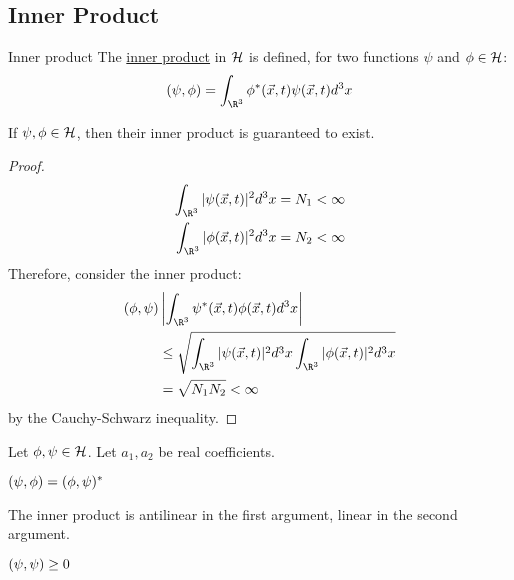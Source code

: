 \documentclass[../Main.tex]{subfiles}
\begin{document}
\subsection{Inner Product}
\begin{definition}{Inner product}
    The \underline{inner product} in $\mathcal{H}$ is defined, for two functions $\psi$ and $\phi \in \mathcal{H}$:
    \begin{equation}
        \inn{\psi}{\phi} = \int_{\R^3} \phi^*(\vec{x}, t) \psi(\vec{x}, t) d^3x
        \label{eqnHilbInnProd}
    \end{equation}
\end{definition}
\begin{theorem}
    If $\psi, \phi \in \mathcal{H}$, then their inner product is guaranteed to exist.
    \label{thmInnProdExists}
\end{theorem}
\begin{proof}
    \begin{align*}
        \int_{\R^3} |\psi(\vec{x}, t)|^2 d^3x &= N_1 < \infty \\
        \int_{\R^3} |\phi(\vec{x}, t)|^2 d^3x &= N_2 < \infty 
    \end{align*}
    Therefore, consider the inner product:
    \begin{align*}
        \inn{\phi}{\psi}& \left|\int_{\R^3} \psi^*(\vec{x}, t)\phi(\vec{x}, t) d^3 x\right| \\
        &\leq \sqrt{\int_{\R^3} |\psi(\vec{x}, t)|^2 d^3x \int_{\R^3} |\phi(\vec{x}, t)|^2 d^3x} \\
        &= \sqrt{N_1 N_2} < \infty
    \end{align*}
    by the Cauchy-Schwarz inequality.
\end{proof}
\begin{propositions}{
        Let $\phi, \psi \in \mathcal{H}$. Let $a_1, a_2$ be real coefficients.
        \label{propsInnProdProps}
    }
    \item $(\psi,\phi) = (\phi,\psi)^*$
    \item The inner product is antilinear in the first argument, linear in the second argument.
    \item $(\psi,\psi) \geq 0$
\end{propositions}
\end{document}
